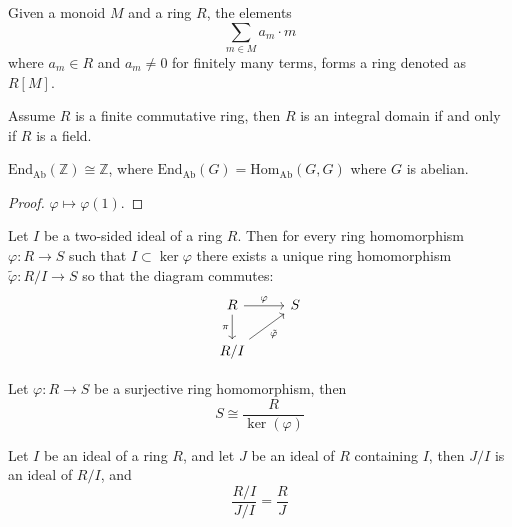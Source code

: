 \documentclass[openany]{book}
\newcommand{\Z}{\mathbb{Z}}
\begin{document}
\begin{defn}
    Given a monoid $M$ and a ring $R$, the elements 
    \begin{equation*}
        \sum_{m\in M}a_m\cdot m
    \end{equation*}
    where $a_m\in R$ and $a_m\neq 0$ for finitely many  terms, forms a ring denoted as $R[M]$.
\end{defn}





\begin{prop}
    Assume $R$ is a finite commutative ring, then $R$ is an integral domain if and only if $R$ is a field.
\end{prop}




\begin{prop}
    $\text{End}_{\text{Ab}}(\Z)\cong\Z$, where $\text{End}_{\text{Ab}}(G)=\text{Hom}_{\text{Ab}}(G,G)$ where $G$ is abelian. 
\end{prop}
\begin{proof}
    $\varphi\mapsto\varphi(1)$.
\end{proof}



\begin{thm}
    Let $I$ be a two-sided ideal of a ring $R$. Then for every ring homomorphism $\varphi: R\to S$ such that $I\subset\ker\varphi$ there exists a unique ring homomorphism $\tilde{\varphi}: R/I\to S$ so that the diagram commutes:
    \[\begin{tikzcd}
        R & S \\
        {R/I}
        \arrow["\varphi", from=1-1, to=1-2]
        \arrow["\pi"', from=1-1, to=2-1]
        \arrow["{\tilde{\varphi}}"', from=2-1, to=1-2]
    \end{tikzcd}\]
\end{thm}

\begin{thm}
    Let $\varphi:R\to S$ be a surjective ring homomorphism, then 
    \begin{equation*}
        S\cong\frac{R}{\ker(\varphi)}
    \end{equation*}
\end{thm}


\begin{prop}
    Let $I$ be an ideal of a ring $R$, and let $J$ be an ideal of $R$ containing $I$, then $J/I$ is an ideal of $R/I$, and 
    \begin{equation*}
        \frac{R/I}{J/I}=\frac{R}{J}
    \end{equation*}
\end{prop}
\end{document}
